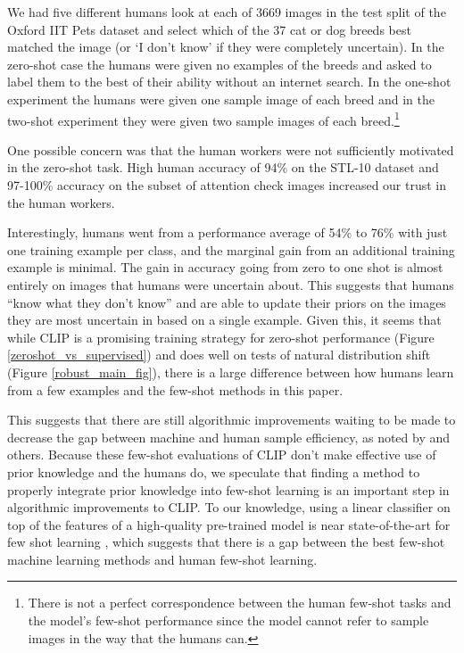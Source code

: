 We had five different humans look at each of 3669 images in the test split of the Oxford IIT Pets dataset \citep{parkhi12a} and select which of the 37 cat or dog breeds best matched the image (or `I don’t know' if they were completely uncertain). In the zero-shot case the humans were given no examples of the breeds and asked to label them to the best of their ability without an internet search. In the one-shot experiment the humans were given one sample image of each breed and in the two-shot experiment they were given two sample images of each breed.\footnote{There is not a perfect correspondence between the human few-shot tasks and the model's few-shot performance since the model cannot refer to sample images in the way that the humans can.}

One possible concern was that the human workers were not sufficiently motivated in the zero-shot task. High human accuracy of 94\% on the STL-10 dataset \cite{coates2011analysis} and 97-100\% accuracy on the subset of attention check images increased our trust in the human workers.

Interestingly, humans went from a performance average of 54\% to 76\% with just one training example per class, and the marginal gain from an additional training example is minimal. The gain in accuracy going from zero to one shot is almost entirely on images that humans were uncertain about. This suggests that humans ``know what they don't know'' and are able to update their priors on the images they are most uncertain in based on a single example. Given this, it seems that while CLIP is a promising training strategy for zero-shot performance (Figure \ref{zeroshot_vs_supervised}) and does well on tests of natural distribution shift (Figure \ref{robust_main_fig}), there is a large difference between how humans learn from a few examples and the few-shot methods in this paper.

This suggests that there are still algorithmic improvements waiting to be made to decrease the gap between machine and human sample efficiency, as noted by \citet{lake2016building} and others. Because these few-shot evaluations of CLIP don't make effective use of prior knowledge and the humans do, we speculate that finding a method to properly integrate prior knowledge into few-shot learning is an important step in algorithmic improvements to CLIP. To our knowledge, using a linear classifier on top of the features of a high-quality pre-trained model is near state-of-the-art for few shot learning \citep{tian2020rethinking}, which suggests that there is a gap between the best few-shot machine learning methods and human few-shot learning.

